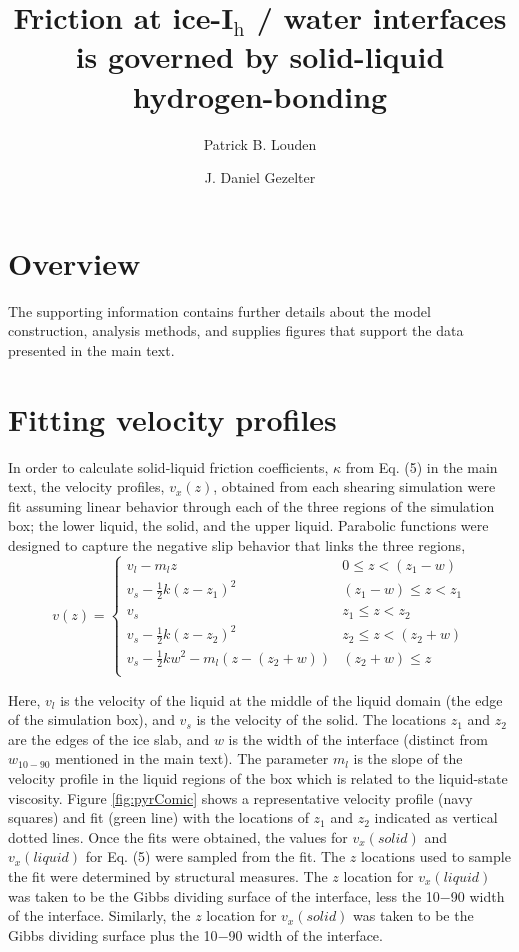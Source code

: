 \documentclass[journal = jpccck, manuscript = suppinfo]{achemso}
\title{Friction at ice-I$_\mathrm{h}$ / water interfaces is governed
  by solid-liquid hydrogen-bonding}
\author{Patrick B. Louden}
\author{J. Daniel Gezelter} \email{gezelter@nd.edu}
\affiliation{Department of Chemistry and Biochemistry, University of
  Notre Dame, Notre Dame, IN 46556}
\begin{document}
\section{Overview}
The supporting information contains further details about the model
construction, analysis methods, and supplies figures that support the
data presented in the main text.

\section{Fitting velocity profiles}
In order to calculate solid-liquid friction coefficients, $\kappa$
from Eq. (5) in the main text, the velocity profiles, $v_x(z)$,
obtained from each shearing simulation were fit assuming linear
behavior through each of the three regions of the simulation box; the
lower liquid, the solid, and the upper liquid. Parabolic functions
were designed to capture the negative slip behavior that links the
three regions,
\begin{equation}\label{vfit}
v(z) =
\begin{cases}
  v_{l} - m_{l}z & 0 \leq z < (z_{1} - w) \\
  v_{s} - \frac{1}{2}k(z-z_{1})^{2} & (z_{1}-w) \leq z < z_{1} \\
  v_{s}  & z_{1} \leq z < z_{2} \\
  v_{s} - \frac{1}{2}k(z-z_{2})^{2}  & z_{2} \leq z <( z_{2} + w)\\
  v_{s} - \frac{1}{2}kw^{2} - m_{l}(z-(z_{2} + w)) & (z_{2} + w) \leq z \\
\end{cases}
\end{equation}
  
Here, $v_{l}$ is the velocity of the liquid at the middle of the
liquid domain (the edge of the simulation box), and $v_{s}$ is the
velocity of the solid. The locations $z_{1}$ and $z_{2}$ are the edges
of the ice slab, and $w$ is the width of the interface (distinct from
$w_{10-90}$ mentioned in the main text). The parameter $m_{l}$ is the
slope of the velocity profile in the liquid regions of the box which
is related to the liquid-state viscosity. Figure \ref{fig:pyrComic}
shows a representative velocity profile (navy squares) and fit (green
line) with the locations of $z_{1}$ and $z_{2}$ indicated as vertical
dotted lines. Once the fits were obtained, the values for
$v_{x}(solid)$ and $v_{x}(liquid)$ for Eq. (5) were sampled from the
fit. The $z$ locations used to sample the fit were determined by
structural measures. The $z$ location for $v_{x}(liquid)$ was taken to
be the Gibbs dividing surface of the interface, less the 10$-$90 width
of the interface. Similarly, the $z$ location for $v_{x}(solid)$ was
taken to be the Gibbs dividing surface plus the 10$-$90 width of the
interface.
\end{document}
